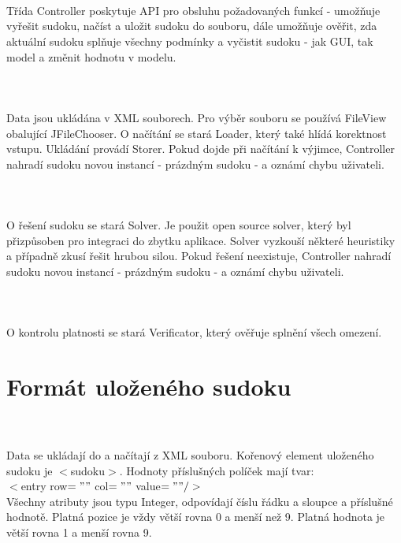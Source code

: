 \documentclass[10pt]{article}
\begin{document}
\paragraph{~} T\v{r}\'ida Controller poskytuje API pro obsluhu po\v{z}adovan\'ych funkc\'i - umo\v{z}\v{n}uje vy\v{r}e\v{s}it sudoku, na\v{c}\'ist a ulo\v{z}it sudoku do souboru, d\'ale umo\v{z}\v{n}uje ov\v{e}\v{r}it, zda aktu\'aln\'i sudoku spl\v{n}uje v\v{s}echny podm\'inky a vy\v{c}istit sudoku - jak GUI, tak model a zm\v{e}nit hodnotu v modelu. 
\paragraph{~}Data jsou ukl\'ad\'ana v XML souborech. Pro v\'yb\v{e}r souboru se pou\v{z}\'iv\'a FileView obaluj\'ic\'i JFileChooser. O na\v{c}\'it\'an\'i se star\'a Loader, kter\'y tak\'e hl\'id\'a korektnost vstupu. Ukl\'ad\'an\'i prov\'ad\'i Storer. Pokud dojde p\v{r}i na\v{c}\'it\'an\'i k v\'yjimce, Controller nahrad\'i sudoku novou instanc\'i - pr\'azdn\'ym sudoku - a ozn\'am\'i chybu u\v{z}ivateli.
\paragraph{~}O \v{r}e\v{s}en\'i sudoku se star\'a Solver. Je pou\v{z}it open source solver, kter\'y byl p\v{r}izp\r{u}soben pro integraci do zbytku aplikace. Solver vyzkou\v{s}\'i n\v{e}kter\'e heuristiky a p\v{r}\'ipadn\v{e} zkus\'i \v{r}e\v{s}it hrubou silou. Pokud \v{r}e\v{s}en\'i neexistuje, Controller nahrad\'i sudoku novou instanc\'i - pr\'azdn\'ym sudoku - a ozn\'am\'i chybu u\v{z}ivateli.
\paragraph{~}O kontrolu platnosti se star\'a Verificator, kter\'y ov\v{e}\v{r}uje spln\v{e}n\'i v\v{s}ech omezen\'i.
\section{Form\'at ulo\v{z}en\'eho sudoku}
\paragraph{~}Data se ukl\'adaj\'i do a na\v{c}\'itaj\'i z XML souboru. Ko\v{r}enov\'y element ulo\v{z}en\'eho sudoku je $<$sudoku$>$. Hodnoty p\v{r}\'islu\v{s}n\'ych pol\'i\v{c}ek maj\'i tvar:\\ $<$entry row$=""$ col$=""$ value$="" />$\\
 V\v{s}echny atributy jsou typu Integer, odpov\'idaj\'i \v{c}\'islu \v{r}\'adku a sloupce a p\v{r}\'islu\v{s}n\'e hodnot\v{e}. Platn\'a pozice je v\v{z}dy v\v{e}t\v{s}\'i rovna 0 a men\v{s}\'i ne\v{z} 9. Platn\'a hodnota je v\v{e}t\v{s}\'i rovna 1 a men\v{s}\'i rovna 9.
\end{document}
